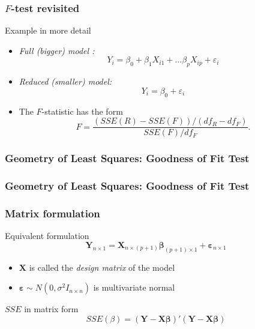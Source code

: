 \documentclass[handout]{beamer}
\begin{document}

   \begin{frame} \frametitle{$F$-test revisited}

   \begin{block}
   {Example in more detail}
   \begin{itemize}
   \item {\em Full (bigger) model :}
   $$
   Y_i = \beta_0 + \beta_1 X_{i1} + \dots \beta_p X_{ip} + \varepsilon_i$$
   \item {\em Reduced (smaller) model:}
   $$
   Y_i = \beta_0  + \varepsilon_i$$

   \item The $F$-statistic has the form
   $$
   F=\frac{(SSE(R) - SSE(F)) / (df_R - df_F)}{SSE(F) / df_F}.$$

   \end{itemize}
   \end{block}
   \end{frame}


   \begin{frame} \frametitle{Geometry of Least Squares: Goodness of Fit Test}

   \end{frame}


   \begin{frame} \frametitle{Geometry of Least Squares: Goodness of Fit Test}

   \end{frame}


   \begin{frame} \frametitle{Matrix formulation}

   \begin{block}
   {Equivalent formulation}
   $${\pmb Y}_{n \times 1} = \pmb{X}_{n \times (p + 1)} \pmb{\beta}_{(p+1) \times 1} + \pmb{\varepsilon}_{n \times 1}$$
   \begin{itemize}

   \item $\pmb{X}$ is called the {\em design matrix} of the model
   \item $\pmb{\varepsilon} \sim N(0, \sigma^2 I_{n \times n})$ is multivariate normal
   \end{itemize}
   \end{block}
   \begin{block}
   {$SSE$ in matrix form}
   $$
   SSE(\beta) = (\pmb{Y} - \pmb{X} \pmb{\beta})'(\pmb{Y} - \pmb{X} \pmb{\beta})
   $$

   \end{block}
   \end{frame}
\end{document}
